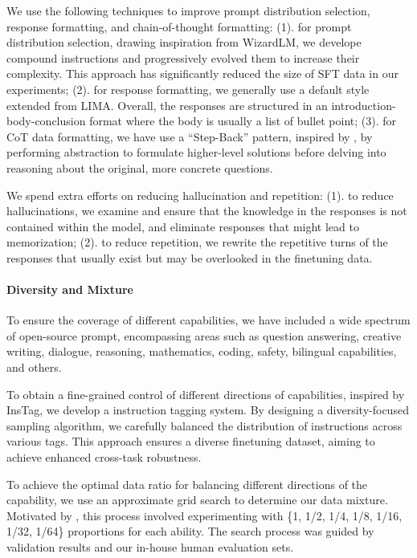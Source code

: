 \documentclass[numbers,sort&compress]{article}
\begin{document}
We use the following techniques to improve prompt distribution selection, response formatting, and chain-of-thought formatting:
(1). for prompt distribution selection,
drawing inspiration from WizardLM\citep{xu2023wizardlm}, we develope compound instructions and progressively evolved them to increase their complexity. 
This approach has significantly reduced the size of SFT data 
in our experiments;
(2). for response formatting, we generally use a default style extended from LIMA\cite{zhou2023lima}. Overall, the responses are structured in an introduction-body-conclusion format where the body is usually a list of bullet point;
(3). for CoT data formatting, we have use a ``Step-Back'' pattern, inspired by \citet{zheng2023step}, by performing abstraction to formulate higher-level solutions before delving into reasoning about the original, more concrete questions.

We spend extra efforts on reducing hallucination and repetition:
(1). to reduce hallucinations, 
we examine and ensure that the knowledge in the responses is not contained within the model, and eliminate responses that might lead to memorization;
(2). to reduce repetition, we rewrite the repetitive turns of the responses that usually exist but may be overlooked in the finetuning data. 

\paragraph{Diversity and Mixture}
To ensure the coverage of different capabilities, we have included a wide spectrum of open-source prompt,
encompassing areas such as question answering, creative writing, dialogue, reasoning, mathematics, coding, safety, bilingual capabilities, and others. 

To obtain a fine-grained control of different directions of capabilities, inspired by InsTag\citep{lu2023instag}, we develop a instruction tagging system. By designing a diversity-focused sampling algorithm, we carefully balanced the distribution of instructions across various tags. This approach ensures a diverse finetuning dataset, aiming to achieve enhanced cross-task robustness.

To achieve the optimal data ratio for balancing different directions of the capability, we use an approximate grid search to determine our data mixture. Motivated by \citet{dong2023abilities}, this process involved experimenting with \{1, 1/2, 1/4, 1/8, 1/16, 1/32, 1/64\} proportions for each ability. The search process was guided by validation results 
and our in-house human evaluation sets.
\end{document}
